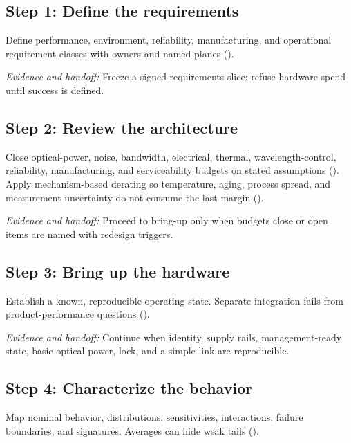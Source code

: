 \subsection{Step 1: Define the requirements}
\label{sec:ladder-requirements}

Define performance, environment, reliability, manufacturing, and operational
requirement classes with owners and named planes
().

\textit{Evidence and handoff:} Freeze a signed requirements slice; refuse
hardware spend until success is defined.

\subsection{Step 2: Review the architecture}
\label{sec:ladder-architecture}

Close optical-power, noise, bandwidth, electrical, thermal, wavelength-control,
reliability, manufacturing, and serviceability budgets on stated assumptions
(). Apply
mechanism-based derating so temperature, aging, process spread, and measurement
uncertainty do not consume the last margin ().

\textit{Evidence and handoff:} Proceed to bring-up only when budgets close or
open items are named with redesign triggers.

\subsection{Step 3: Bring up the hardware}
\label{sec:ladder-bringup}

Establish a known, reproducible operating state. Separate integration fails
from product-performance questions ().

\textit{Evidence and handoff:} Continue when identity, supply rails,
management-ready state, basic optical power, lock, and a simple link are
reproducible.

\subsection{Step 4: Characterize the behavior}
\label{sec:ladder-characterization}

Map nominal behavior, distributions, sensitivities, interactions, failure
boundaries, and signatures. Averages can hide weak tails
().

